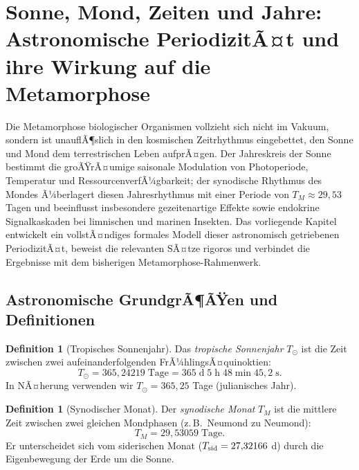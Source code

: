 ﻿\documentclass[12pt, a4paper]{article}
\theoremstyle{definition}
\newtheorem{definition}[theorem]{Definition}
\begin{document}

\section{Sonne, Mond, Zeiten und Jahre: Astronomische PeriodizitÃ¤t und ihre
  Wirkung auf die Metamorphose}\label{sec:astronomie}

Die Metamorphose biologischer Organismen vollzieht sich nicht im Vakuum, sondern
ist unauflÃ¶slich in den kosmischen Zeitrhythmus eingebettet, den Sonne und Mond
dem terrestrischen Leben aufprÃ¤gen. Der Jahreskreis der Sonne bestimmt die
groÃŸrÃ¤umige saisonale Modulation von Photoperiode, Temperatur und Ressourcen\-verfÃ¼gbarkeit;
der synodische Rhythmus des Mondes Ã¼berlagert diesen Jahresrhythmus mit einer
Periode von $T_M \approx 29{,}53$ Tagen und beeinflusst insbesondere gezeitenartige
Effekte sowie endokrine Signalkaskaden bei limnischen und marinen Insekten. Das
vorliegende Kapitel entwickelt ein vollstÃ¤ndiges formales Modell dieser astronomisch
getriebenen PeriodizitÃ¤t, beweist die relevanten SÃ¤tze rigoros und verbindet
die Ergebnisse mit dem bisherigen Metamorphose-Rahmenwerk.

\subsection{Astronomische GrundgrÃ¶ÃŸen und Definitionen}

\begin{definition}[Tropisches Sonnenjahr]\label{def:sonnenjahr}
Das \emph{tropische Sonnenjahr} $T_{\odot}$ ist die Zeit zwischen zwei aufeinander\-folgenden
FrÃ¼hlingsÃ¤quinoktien:
\[
  T_{\odot} = 365{,}24219\;\text{Tage} = 365\;\text{d}\;5\;\text{h}\;48\;\text{min}\;45{,}2\;\text{s}.
\]
In NÃ¤herung verwenden wir $T_{\odot} = 365{,}25$ Tage (julianisches Jahr).
\end{definition}

\begin{definition}[Synodischer Monat]\label{def:synodisch}
Der \emph{synodische Monat} $T_M$ ist die mittlere Zeit zwischen zwei gleichen
Mondphasen (z.\,B.\ Neumond zu Neumond):
\[
  T_M = 29{,}53059\;\text{Tage}.
\]
Er unterscheidet sich vom siderischen Monat ($T_{\rm sid} = 27{,}32166$ d) durch
die Eigenbewegung der Erde um die Sonne.
\end{definition}
\end{document}
